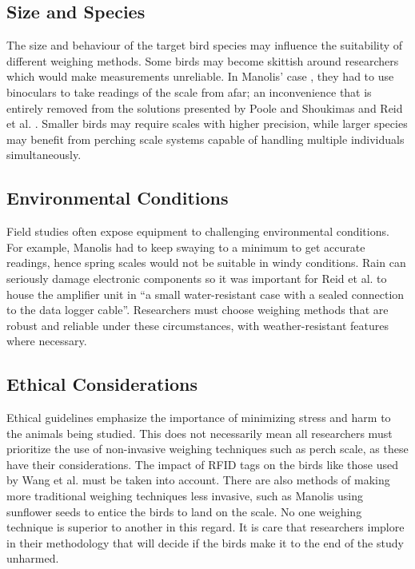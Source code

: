 \documentclass[class=report,11pt,crop=false]{standalone}
\begin{document}
\subsection{Size and Species}
The size and behaviour of the target bird species may influence the suitability of different weighing methods. Some birds may become skittish around researchers which would make measurements unreliable. In Manolis’ case \cite{manoils2024simple}, they had to use binoculars to take readings of the scale from afar; an inconvenience that is entirely removed from the solutions presented by Poole and Shoukimas \cite{poole1982scale} and Reid et al. \cite{reid1999measurement}. Smaller birds may require scales with higher precision, while larger species may benefit from perching scale systems capable of handling multiple individuals simultaneously.

\subsection{Environmental Conditions}
Field studies often expose equipment to challenging environmental conditions. For example, Manolis \cite{manoils2024simple} had to keep swaying to a minimum to get accurate readings, hence spring scales would not be suitable in windy conditions. Rain can seriously damage electronic components so it was important for Reid et al. \cite{reid1999measurement} to house the amplifier unit in “a small water-resistant case with a sealed connection to the data logger cable”. Researchers must choose weighing methods that are robust and reliable under these circumstances, with weather-resistant features where necessary.

\subsection{Ethical Considerations}
Ethical guidelines emphasize the importance of minimizing stress and harm to the animals being studied. This does not necessarily mean all researchers must prioritize the use of non-invasive weighing techniques such as perch scale, as these have their considerations. The impact of RFID tags on the birds like those used by Wang et al. \cite{wang2019rfid} must be taken into account. There are also methods of making more traditional weighing techniques less invasive, such as Manolis \cite{reid1999measurement} using sunflower seeds to entice the birds to land on the scale. No one weighing technique is superior to another in this regard. It is care that researchers implore in their methodology that will decide if the birds make it to the end of the study unharmed.
\end{document}
